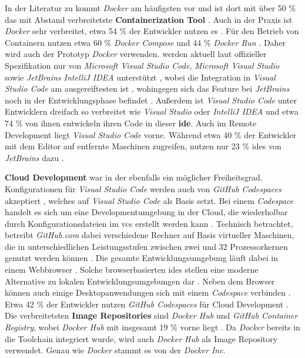 In der Literatur zu  kommt \textit{Docker} am häufigsten vor und ist dort mit über 50 \% das mit Abstand verbreitetste \textbf{Containerization Tool} \cite{015:Containers-in-Software-Development}. Auch in der Praxis ist \textit{Docker} sehr verbreitet, etwa 54 \% der Entwickler nutzen es \cite{206:Developer-Survey-2024,207:Developer-Ecosystem}. Für den Betrieb von Containern nutzen etwa 60 \% \textit{Docker Compose} und 44 \% \textit{Docker Run} \cite{207:Developer-Ecosystem}. Daher wird auch der Prototyp \textit{Docker} verwenden.  werden aktuell laut offizieller Spezifikation nur von \textit{Microsoft Visual Studio Code}, \textit{Microsoft Visual Studio} sowie \textit{JetBrains IntelliJ IDEA} unterstützt \cite{306:Development-Containers}, wobei die Integration in \textit{Visual Studio Code} am ausgereiftesten ist \cite{204:Development-Containers-Simplified}, wohingegen sich das Feature bei \textit{JetBrains} noch in der Entwicklungsphase befindet \cite{306:Development-Containers}. Außerdem ist \textit{Visual Studio Code} unter Entwicklern dreifach so verbreitet wie \textit{Visual Studio} oder \textit{IntelliJ IDEA} und etwa 74 \% von ihnen entwickeln ihren Code in dieser \textbf{\Gls{ide}}. Auch im Remote Development liegt \textit{Visual Studio Code} vorne. Während etwa 40 \% der Entwickler mit dem Editor auf entfernte Maschinen zugreifen, nutzen nur 23 \% \Glspl{ide} von \textit{JetBrains} dazu \cite{207:Developer-Ecosystem}.

\textbf{Cloud Development} war in der  ebenfalls ein möglicher Freiheitsgrad.  Konfigurationen für \textit{Visual Studio Code} werden auch von \textit{GitHub Codespaces} akzeptiert \cite{306:Development-Containers}, welches auf \textit{Visual Studio Code} als Basis setzt. Bei einem \textit{Codespace} handelt es sich um eine Developmentumgebung in der Cloud, die wiederholbar durch Konfigurationsdateien im \Gls{vcs} erstellt werden kann \cite{310:GitHub-Codespaces-Overview}. Technisch betrachtet, betreibt \textit{GitHub.com} dabei verschiedene Rechner auf Basis virtueller Maschinen, die in unterschiedlichen Leistungsstufen zwischen zwei und 32 Prozessorkernen genutzt werden können \cite{306:Development-Containers}. Die gesamte Entwicklungsumgebung läuft dabei in einem Webbrowser \cite{310:GitHub-Codespaces-Overview}. Solche browserbasierten \Glspl{ide} stellen eine moderne Alternative zu lokalen Entwicklungsumgebungen dar \cite{004:Continous-Integration-and-Development-Tool-Setup-and-Pipeline-Evolution}. Neben dem Browser können auch einige Desktopanwendungen sich mit einem \textit{Codespace} verbinden \cite{310:GitHub-Codespaces-Overview}. Etwa 42 \% der Entwickler nutzen \textit{GitHub Codespaces} für Cloud Development \cite{207:Developer-Ecosystem}. Die verbreitetsten \textbf{Image Repositories} sind \textit{Docker Hub} und \textit{GitHub Container Registry}, wobei \textit{Docker Hub} mit insgesamt 19 \% vorne liegt \cite{207:Developer-Ecosystem}. Da \textit{Docker} bereits in die Toolchain integriert wurde, wird auch \textit{Docker Hub} als Image Repository verwendet. Genau wie \textit{Docker} stammt es von der \textit{Docker Inc}.

